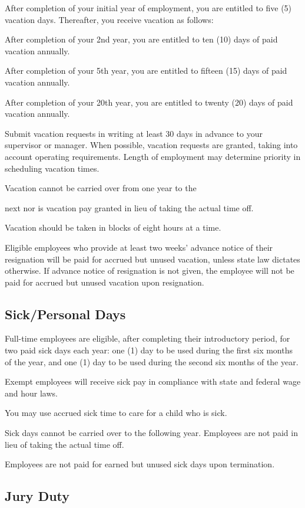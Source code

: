 After completion of your initial year of employment, you are entitled to five (5) vacation days. Thereafter, you receive vacation as follows:

After completion of your 2nd year, you are entitled to ten (10) days of paid vacation annually.

After completion of your 5th year, you are entitled to fifteen (15) days of paid vacation annually.

After completion of your 20th year, you are entitled to twenty (20) days of paid vacation annually.

Submit vacation requests in writing at least 30 days in advance to your supervisor or manager. When possible, vacation requests are granted, taking into account operating requirements. Length of employment may determine priority in scheduling vacation times.

Vacation cannot be carried over from one year to the

next nor is vacation pay granted in lieu of taking the actual time off.

Vacation should be taken in blocks of eight hours at a time.

Eligible employees who provide at least two weeks’ advance notice of their resignation will be paid for accrued but unused vacation, unless state law dictates otherwise. If advance notice of resignation is not given, the employee will not be paid for accrued but unused vacation upon resignation.

\subsection{Sick/Personal Days}

Full-time employees are eligible, after completing their introductory period, for two paid sick days each year: one (1) day to be used during the first six months of the year, and one (1) day to be used during the second six months of the year.

Exempt employees will receive sick pay in compliance with state and federal wage and hour laws.

You may use accrued sick time to care for a child who is sick.

Sick days cannot be carried over to the following year. Employees are not paid in lieu of taking the actual time off.

Employees are not paid for earned but unused sick days upon termination.

\subsection{Jury Duty}

